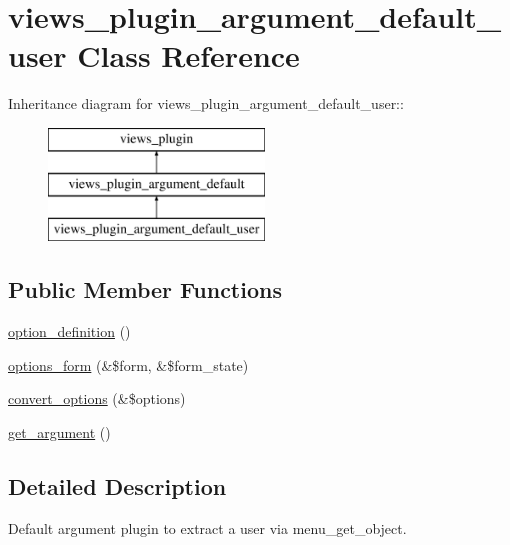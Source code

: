 \hypertarget{classviews__plugin__argument__default__user}{
\section{views\_\-plugin\_\-argument\_\-default\_\-user Class Reference}
\label{classviews__plugin__argument__default__user}
}
Inheritance diagram for views\_\-plugin\_\-argument\_\-default\_\-user::\begin{figure}[H]
\begin{center}
\leavevmode
\includegraphics[height=3cm]{classviews__plugin__argument__default__user}
\end{center}
\end{figure}
\subsection*{Public Member Functions}
\begin{DoxyCompactItemize}
\item 
\hyperlink{classviews__plugin__argument__default__user_a7658c2ea175f9a2bf4c48e6e4a34fea8}{option\_\-definition} ()
\item 
\hyperlink{classviews__plugin__argument__default__user_aa034a957fc75daf289368c429a26e10e}{options\_\-form} (\&\$form, \&\$form\_\-state)
\item 
\hyperlink{classviews__plugin__argument__default__user_ae184e4a33635d3e1e29cdbbfbb4c0c72}{convert\_\-options} (\&\$options)
\item 
\hyperlink{classviews__plugin__argument__default__user_af7dc56a3ce8a8cf8ad12595952dc70e6}{get\_\-argument} ()
\end{DoxyCompactItemize}


\subsection{Detailed Description}
Default argument plugin to extract a user via menu\_\-get\_\-object. 


